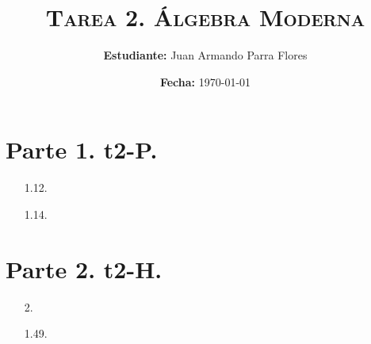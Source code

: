 \documentclass[11pt]{article}
\title{
    \textsc{
        \textbf{Tarea 2.} Álgebra Moderna
    }
}
\author{
    \textbf{Estudiante:} Juan Armando Parra Flores
}
\date{
    \textbf{Fecha:} \today
}
\begin{document}
    {
        \pagestyle{plain}
        \maketitle
    }

    \section*{Parte 1. t2-P.}
    \begin{itemize}
        \item[1.12.]
            
        \item[1.14.]
            
    \end{itemize}

    \section*{Parte 2. t2-H.}
    \begin{itemize}
        \item[2.]
            
        \item[1.49.]
               
    \end{itemize}

\end{document}

